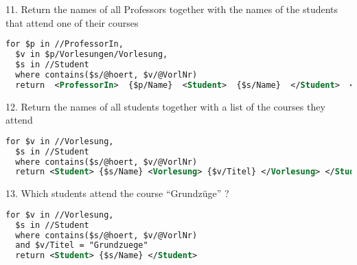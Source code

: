 11. Return	the	names	of	all	Professors	together	with	the	names	of	the	students	that	attend	one
of	their	courses
\begin{lstlisting}[language=XML]
  for $p in //ProfessorIn,
  $v in $p/Vorlesungen/Vorlesung,
  $s in //Student
  where contains($s/@hoert, $v/@VorlNr)
  return  <ProfessorIn>  {$p/Name}  <Student>  {$s/Name}  </Student>  </ProfessorIn>
\end{lstlisting}

12. Return	the	names	of	all	students	together	with	a	list	of	the	courses	they	attend
\begin{lstlisting}[language=XML]
  for $v in //Vorlesung,
  $s in //Student
  where contains($s/@hoert, $v/@VorlNr)
  return <Student> {$s/Name} <Vorlesung> {$v/Titel} </Vorlesung> </Student>
\end{lstlisting}

13. Which	students	attend	the	course	“Grundzüge”	?
\begin{lstlisting}[language=XML]
  for $v in //Vorlesung,
  $s in //Student
  where contains($s/@hoert, $v/@VorlNr)
  and $v/Titel = "Grundzuege"
  return <Student> {$s/Name} </Student>
\end{lstlisting}
